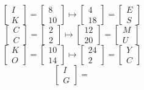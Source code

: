\documentclass[letterpaper,10pt]{article}
\begin{document}
\begin{enumerate}
\begin{enumerate}
\begin{equation*}
        \end{equation*}
        \begin{equation*}
            \begin{bmatrix} I \\ K \end{bmatrix} =
            \begin{bmatrix} 8 \\ 10 \end{bmatrix} \mapsto
            \begin{bmatrix} 4 \\ 18 \end{bmatrix} =
            \begin{bmatrix} E \\ S \end{bmatrix}
        \end{equation*}
        \begin{equation*}
            \begin{bmatrix} C \\ C \end{bmatrix} =
            \begin{bmatrix} 2 \\ 2 \end{bmatrix} \mapsto
            \begin{bmatrix} 12 \\ 20 \end{bmatrix} =
            \begin{bmatrix} M \\ U \end{bmatrix}
        \end{equation*}
        \begin{equation*}
            \begin{bmatrix} K \\ O \end{bmatrix} =
            \begin{bmatrix} 10 \\ 14 \end{bmatrix} \mapsto
            \begin{bmatrix} 24 \\ 2 \end{bmatrix} =
            \begin{bmatrix} Y \\ C \end{bmatrix}
        \end{equation*}
        \begin{equation*}
            \begin{bmatrix} I \\ G \end{bmatrix} =

\end{equation*}
\end{enumerate}
\end{enumerate}
\end{document}
